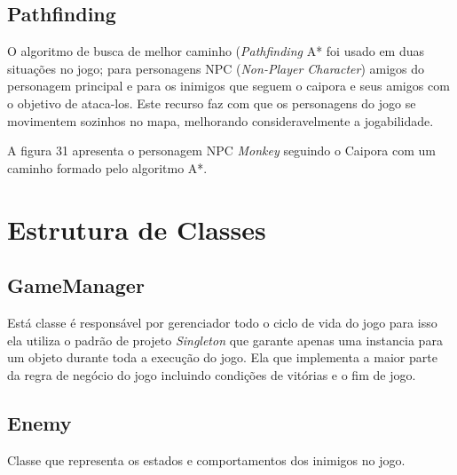 	
	
\subsection{Pathfinding}
O algoritmo de busca de melhor caminho (\textit{Pathfinding} A* foi usado em duas situações no jogo; para personagens NPC (\textit{Non-Player Character}) amigos do personagem principal e para os inimigos que seguem o caipora e seus amigos com o objetivo de ataca-los.  Este recurso faz com que os personagens do jogo se movimentem sozinhos no mapa, melhorando consideravelmente a jogabilidade.


A figura 31 apresenta o personagem NPC \textit{Monkey} seguindo o Caipora com um caminho formado pelo algoritmo A*.

\begin{figure}[h!]
		\centering
	\end{figure}
	
	
	
	
	\section{Estrutura de Classes}
	
\subsection{GameManager}
Está classe é responsável por gerenciador todo o ciclo de vida do jogo para isso ela  utiliza o padrão de projeto \textit{Singleton} que garante apenas uma instancia para um objeto durante toda a execução do jogo. Ela que implementa a maior parte da regra de negócio do jogo incluindo condições de vitórias e o fim de jogo.

\subsection{Enemy}
Classe que representa os estados e comportamentos dos inimigos no jogo.


